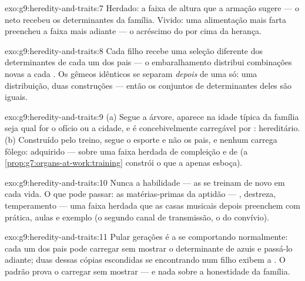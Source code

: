 \begin{solution}{exo:g9:heredity-and-traits:7}
Herdado: a faixa de altura que a armação sugere --- o neto
recebeu os determinantes da família. Vivido: uma alimentação
mais farta preencheu a faixa mais adiante --- o acréscimo do
 por cima da herança.
\end{solution}

\begin{solution}{exo:g9:heredity-and-traits:8}
Cada filho recebe uma seleção diferente dos determinantes de
cada um dos pais --- o embaralhamento distribui combinações
novas a cada . Os gêmeos idênticos se separam
\emph{depois} de uma  só: uma distribuição, duas
construções --- então os conjuntos de determinantes deles
são iguais.
\end{solution}

\begin{solution}{exo:g9:heredity-and-traits:9}
(a) Segue a árvore, aparece na idade típica da família seja
qual for o ofício ou a cidade, e é concebivelmente
carregável por : hereditário. (b) Construído pelo
treino, segue o esporte e não os pais, e nenhum 
carrega fôlego: adquirido --- sobre uma faixa herdada de
compleição e de  (a
\cref{prop:g7:organs-at-work:training} constrói o que a
 apenas esboça).
\end{solution}

\begin{solution}{exo:g9:heredity-and-traits:10}
Nunca a habilidade --- as  se treinam de novo em
cada vida. O que pode passar: as matérias-primas da aptidão
--- , destreza, temperamento --- uma faixa herdada que
as casas musicais depois preenchem com prática, aulas e
exemplo (o segundo canal de transmissão, o do convívio).
\end{solution}

\begin{solution}{exo:g9:heredity-and-traits:11}
Pular gerações é a  se comportando
normalmente: cada um dos pais pode carregar sem mostrar o
determinante de  azuis e passá-lo adiante; duas dessas
cópias escondidas se encontrando num filho exibem a
. O padrão prova o carregar sem mostrar --- e
nada sobre a honestidade da família.
\end{solution}

